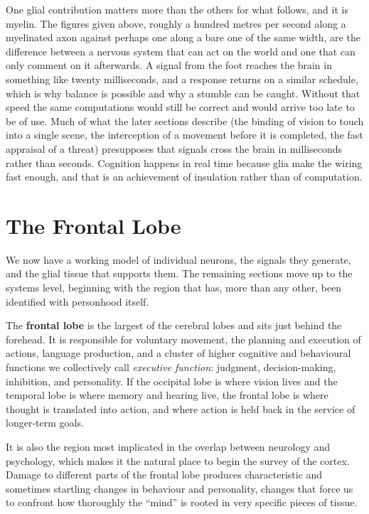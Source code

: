 \documentclass[11pt]{article}
\begin{document}
One glial contribution matters more than the others for what follows, and it is myelin. The figures given above, roughly a hundred metres per second along a myelinated axon against perhaps one along a bare one of the same width, are the difference between a nervous system that can act on the world and one that can only comment on it afterwards. A signal from the foot reaches the brain in something like twenty milliseconds, and a response returns on a similar schedule, which is why balance is possible and why a stumble can be caught. Without that speed the same computations would still be correct and would arrive too late to be of use. Much of what the later sections describe (the binding of vision to touch into a single scene, the interception of a movement before it is completed, the fast appraisal of a threat) presupposes that signals cross the brain in milliseconds rather than seconds. Cognition happens in real time because glia make the wiring fast enough, and that is an achievement of insulation rather than of computation.


\section{The Frontal Lobe}

We now have a working model of individual neurons, the signals they generate, and the glial tissue that supports them. The remaining sections move up to the systems level, beginning with the region that has, more than any other, been identified with personhood itself.

The \textbf{frontal lobe} is the largest of the cerebral lobes and sits just behind the forehead. It is responsible for voluntary movement, the planning and execution of actions, language production, and a cluster of higher cognitive and behavioural functions we collectively call \textit{executive function}: judgment, decision-making, inhibition, and personality. If the occipital lobe is where vision lives and the temporal lobe is where memory and hearing live, the frontal lobe is where thought is translated into action, and where action is held back in the service of longer-term goals.

It is also the region most implicated in the overlap between neurology and psychology, which makes it the natural place to begin the survey of the cortex. Damage to different parts of the frontal lobe produces characteristic and sometimes startling changes in behaviour and personality, changes that force us to confront how thoroughly the ``mind'' is rooted in very specific pieces of tissue.
\end{document}
